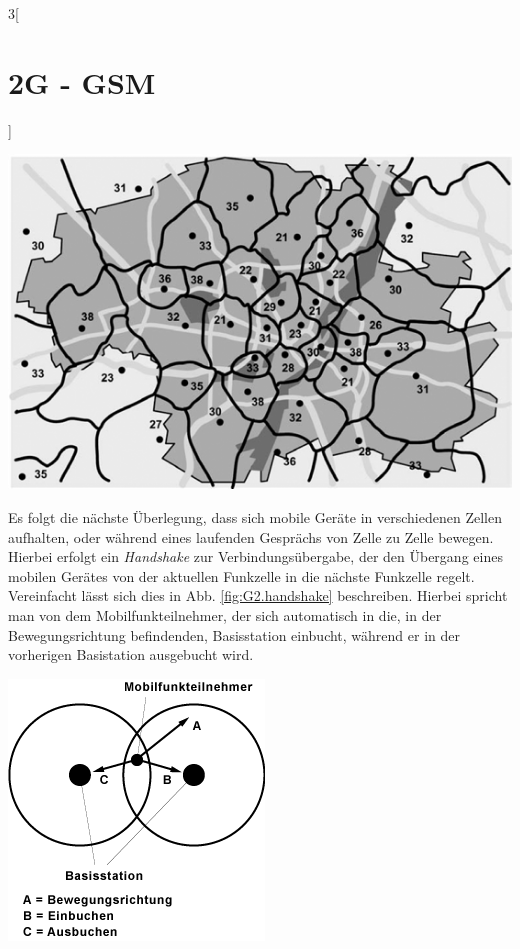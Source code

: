 \begin{multicols}{3}[\section{2G - GSM}]
\begin{Figure}
\includegraphics[width=\linewidth]{Kapitel/2G/Grafiken/GSM-Funkzellen.png}
\label{fig:G2.funkzellen}
\end{Figure}
Es folgt die nächste Überlegung, dass sich mobile Geräte in verschiedenen Zellen aufhalten, oder während eines laufenden Gesprächs von Zelle zu Zelle bewegen. Hierbei erfolgt ein \textit{Hand\-shake} zur Verbindungsübergabe, der den Übergang eines mobilen Gerätes von der aktuellen Funkzelle in die nächste Funkzelle regelt.
Vereinfacht lässt sich dies in Abb. \ref{fig:G2.handshake} beschreiben. Hierbei spricht man von dem Mobilfunkteilnehmer, der sich automatisch in die, in der Bewegungsrichtung befindenden, Basisstation einbucht, während er in der vorherigen Basistation ausgebucht wird.\cite{G2.3}
\begin{Figure}
\includegraphics[width=\linewidth]{Kapitel/2G/Grafiken/GSM-Handshake.png}
\label{fig:G2.handshake}
\end{Figure}

\end{multicols}
